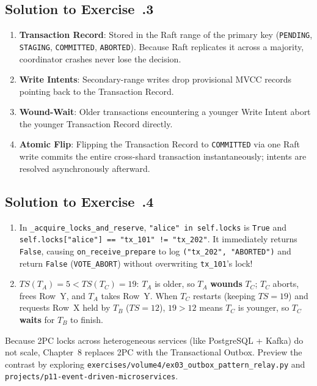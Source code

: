\subsection*{Solution to Exercise~\thechapter.3}
\begin{enumerate}[leftmargin=18pt]
  \item \textbf{Transaction Record}: Stored in the Raft range of the primary key (\texttt{PENDING}, \texttt{STAGING}, \texttt{COMMITTED}, \texttt{ABORTED}). Because Raft replicates it across a majority, coordinator crashes never lose the decision.
  \item \textbf{Write Intents}: Secondary-range writes drop provisional MVCC records pointing back to the Transaction Record.
  \item \textbf{Wound-Wait}: Older transactions encountering a younger Write Intent abort the younger Transaction Record directly.
  \item \textbf{Atomic Flip}: Flipping the Transaction Record to \texttt{COMMITTED} via one Raft write commits the entire cross-shard transaction instantaneously; intents are resolved asynchronously afterward.
\end{enumerate}

\subsection*{Solution to Exercise~\thechapter.4}
\begin{enumerate}[leftmargin=18pt]
  \item In \texttt{\_acquire\_locks\_and\_reserve}, \texttt{"alice" in self.locks} is \texttt{True} and \texttt{self.locks["alice"] == "tx\_101" != "tx\_202"}. It immediately returns \texttt{False}, causing \texttt{on\_receive\_prepare} to log \texttt{("tx\_202", "ABORTED")} and return \texttt{False} (\texttt{VOTE\_ABORT}) without overwriting \texttt{tx\_101}'s lock!
  \item $TS(T_A)=5 < TS(T_C)=19$: $T_A$ is older, so $T_A$ \textbf{wounds} $T_C$; $T_C$ aborts, frees Row~Y, and $T_A$ takes Row~Y. When $T_C$ restarts (keeping $TS=19$) and requests Row~X held by $T_B$ ($TS=12$), $19 > 12$ means $T_C$ is younger, so $T_C$ \textbf{waits} for $T_B$ to finish.
\end{enumerate}

\begin{labbridgebox}
Because 2PC locks across heterogeneous services (like PostgreSQL + Kafka) do not scale, Chapter~8 replaces 2PC with the Transactional Outbox. Preview the contrast by exploring \texttt{exercises/volume4/ex03\_outbox\_pattern\_relay.py} and \texttt{projects/p11-event-driven-microservices}.
\end{labbridgebox}

